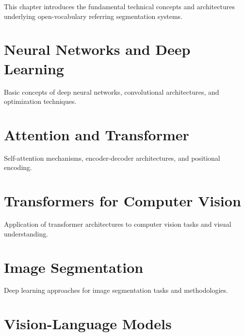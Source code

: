 \cleardoublepage
\label{chap:back}

This chapter introduces the fundamental technical concepts and architectures underlying open-vocabulary referring segmentation systems.

\section{Neural Networks and Deep Learning}

Basic concepts of deep neural networks, convolutional architectures, and optimization techniques.

\section{Attention and Transformer}

Self-attention mechanisms, encoder-decoder architectures, and positional encoding.

\section{Transformers for Computer Vision}

Application of transformer architectures to computer vision tasks and visual understanding.

\section{Image Segmentation}

Deep learning approaches for image segmentation tasks and methodologies.

\section{Vision-Language Models}

